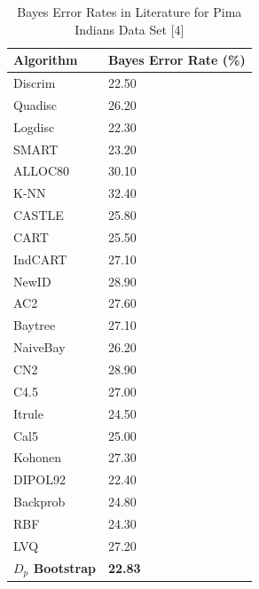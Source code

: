 \documentclass{article}
\begin{document}
	\newpage
		\begin{table}[!h]		
			\caption{Bayes Error Rates in Literature for Pima Indians Data Set [4]}
			\begin{center}
				\begin{tabular}[!h]{ |p{3cm}||p{4cm}|  }
					
					\hline
					Algorithm & Bayes Error Rate (\%) \\ [0.5ex] 
					\hline\hline
					
					 Discrim & 22.50	\\
					 Quadisc &  26.20	\\
					 Logdisc &  22.30	\\
					 SMART  & 23.20	\\
					 ALLOC80 &  30.10	\\
					 K-NN  & 32.40	\\
					 CASTLE &  25.80	\\
					 CART  & 25.50	\\
					 IndCART &  27.10	\\
					 NewID &  28.90	\\
					 AC2 &  27.60	\\
					 Baytree  & 27.10	\\
					 NaiveBay &  26.20	\\
					 CN2  & 28.90	\\
					 C4.5  & 27.00	\\
					 Itrule &  24.50	\\
					 Cal5  & 25.00	\\
					 Kohonen &  27.30	\\
					 DIPOL92 &  22.40	\\
					 Backprob  & 24.80	\\
					 RBF  & 24.30	\\
					 LVQ  & 27.20 	\\
					\textbf{$D_p$ Bootstrap } & \textbf{22.83} \\ 
					\hline 		
				\end{tabular}
			\end{center}
		\end{table}
		
\end{document}
